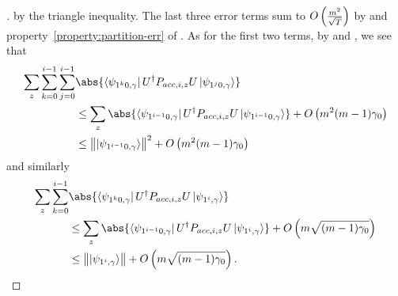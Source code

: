 \begin{proof}[]
	by the triangle inequality.
	The last three error terms sum to $O\left(\frac{m^2}{\sqrt{T}}\right)$ by  and property~\ref{property:partition-err} of .
	As for the first two terms, by  and , we see that
	\begin{align*}
		\sum_z \sum_{k=0}^{i-1}\sum_{j=0}^{i-1}
		&\abs{\bra{\psi_{1^k0,\gamma}}U^\dag  P_{acc,i,z}U \ket{\psi_{1^j0,\gamma}}} \\
		&\leq\sum_z \abs{\bra{\psi_{1^{i-1}0,\gamma}}U^\dag  P_{acc,i,z}U \ket{\psi_{1^{i-1}0,\gamma}}} + O\L(m^2(m-1)\gamma_0\R) \\
		&\leq\norm{\ket{\psi_{1^{i-1}0,\gamma}}}^2 + O\L(m^2(m-1)\gamma_0\R)
	\end{align*}
	and similarly
	\begin{align*}
		\sum_z\sum_{k=0}^{i-1}
		&\abs{\bra{\psi_{1^k0,\gamma}}U^\dag  P_{acc,i,z}U \ket{\psi_{1^i,\gamma}}}\\
		&\leq\sum_z\abs{\bra{\psi_{1^{i-1}0,\gamma}}U^\dag  P_{acc,i,z}U \ket{\psi_{1^i,\gamma}}}+O\L(m\sqrt{(m-1)\gamma_0}\R)\\
		&\leq\norm{\ket{\psi_{1^i,\gamma}}}+O\L(m\sqrt{(m-1)\gamma_0}\R).
	\end{align*}
\end{proof}
